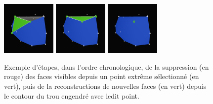 \documentclass[]{article}
\begin{document}
\begin{figure}[H]
	\includegraphics[width=2.65cm]{qh3d/demo3d/add_rem_3.png}
	\includegraphics[width=2.65cm]{qh3d/demo3d/add_rem_2.png}
	\includegraphics[width=2.65cm]{qh3d/demo3d/add_rem_1.png}
	\caption{Exemple d'étapes, dans l'ordre chronologique, de la suppression (en rouge) des faces visibles depuis un point extrême sélectionné (en vert), puis de la reconstructions de nouvelles faces (en vert) depuis le contour du trou engendré avec ledit point.}
\end{figure}
\end{document}
